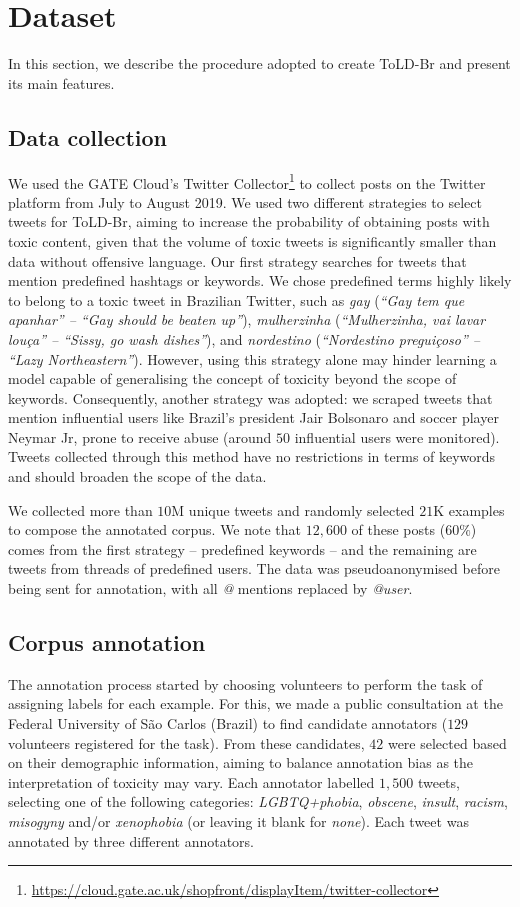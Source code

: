 \documentclass[11pt,a4paper]{article}
\begin{document}
\section{Dataset} \label{sec:dataset}
In this section, we describe the procedure adopted to create ToLD-Br and present its main features.

\subsection{Data collection}
We used the GATE Cloud's Twitter Collector\footnote{\url{https://cloud.gate.ac.uk/shopfront/displayItem/twitter-collector}} to collect posts on the Twitter platform from July to August 2019. We used two different strategies to select tweets for ToLD-Br, aiming to increase the probability of obtaining posts with toxic content, given that the volume of toxic tweets is significantly smaller than data without offensive language.
Our first strategy searches for tweets that mention predefined hashtags or keywords. We chose predefined terms highly likely to belong to a toxic tweet in Brazilian Twitter, such as \textit{gay} (\textit{``Gay tem que apanhar'' -- ``Gay should be beaten up''}), \textit{mulherzinha} (\textit{``Mulherzinha, vai lavar louça'' -- ``Sissy, go wash dishes''}), and \textit{nordestino} (\textit{``Nordestino preguiçoso'' -- ``Lazy Northeastern''}). However, using this strategy alone may hinder learning a model capable of generalising the concept of toxicity beyond the scope of keywords. 
Consequently, another strategy was adopted: we scraped tweets that mention influential users like Brazil's president Jair Bolsonaro and soccer player Neymar Jr, prone to receive abuse (around $50$ influential users were monitored). Tweets collected through this method have no restrictions in terms of keywords and should broaden the scope of the data.

We collected more than $10$M unique tweets and randomly selected $21$K examples to compose the annotated corpus. We note that $12,600$ of these posts ($60\%$) comes from the first strategy -- predefined keywords -- and the remaining are tweets from threads of predefined users. The data was pseudoanonymised before being sent for annotation, with all \textit{@} mentions replaced by \textit{@user}.


\subsection{Corpus annotation}
The annotation process started by choosing volunteers to perform the task of assigning labels for each example. For this, we made a public consultation at the Federal University of S\~{a}o Carlos (Brazil) to find candidate annotators ($129$ volunteers registered for the task). From these candidates, $42$ were selected based on their demographic information, aiming to balance annotation bias as the interpretation of toxicity may vary. Each annotator labelled $1,500$ tweets, selecting one of the following categories: \textit{LGBTQ+phobia}, \textit{obscene}, \textit{insult}, \textit{racism}, \textit{misogyny} and/or \textit{xenophobia} (or leaving it blank for \textit{none}). Each tweet was annotated by three different annotators. 
\end{document}
